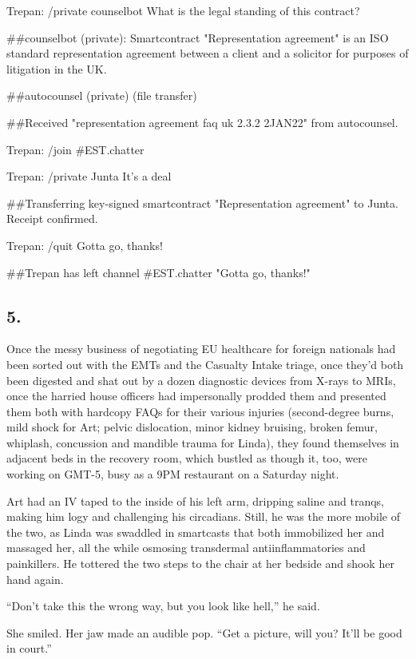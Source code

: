 {Trepan: /private counselbot What is the legal standing of this
contract?

\#\#counselbot (private): Smartcontract "Representation agreement"
is an ISO standard representation agreement between a client and a
solicitor for purposes of litigation in the UK.

\#\#autocounsel (private) (file transfer)

\#\#Received "representation agreement faq uk 2.3.2 2JAN22" from
autocounsel.

Trepan: /join \#EST.chatter

Trepan: /private Junta It's a deal

\#\#Transferring key-signed smartcontract "Representation
agreement" to Junta. Receipt confirmed.

Trepan: /quit Gotta go, thanks!

\#\#Trepan has left channel \#EST.chatter "Gotta go, thanks!"

}

\subsection{5.}

Once the messy business of negotiating EU healthcare for foreign
nationals had been sorted out with the EMTs and the Casualty Intake
triage, once they’d both been digested and shat out by a dozen
diagnostic devices from X-rays to MRIs, once the harried house
officers had impersonally prodded them and presented them both with
hardcopy FAQs for their various injuries (second-degree burns, mild
shock for Art; pelvic dislocation, minor kidney bruising, broken
femur, whiplash, concussion and mandible trauma for Linda), they
found themselves in adjacent beds in the recovery room, which
bustled as though it, too, were working on GMT-5, busy as a 9PM
restaurant on a Saturday night.

Art had an IV taped to the inside of his left arm, dripping saline
and tranqs, making him logy and challenging his circadians. Still,
he was the more mobile of the two, as Linda was swaddled in
smartcasts that both immobilized her and massaged her, all the
while osmosing transdermal antiinflammatories and painkillers. He
tottered the two steps to the chair at her bedside and shook her
hand again.

“Don’t take this the wrong way, but you look like hell,” he said.

She smiled. Her jaw made an audible pop. “Get a picture, will you?
It’ll be good in court.”

